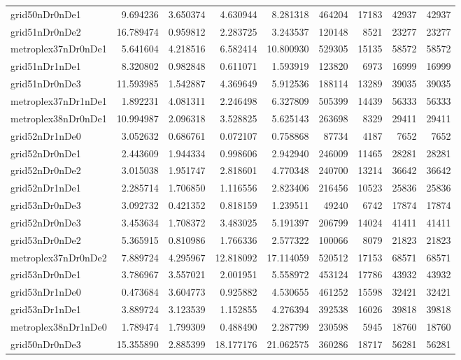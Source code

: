 \begin{longtable}{|l|r|r|r|r|r|r|r|r|}
grid50nDr0nDe1 & 9.694236 & 3.650374 & 4.630944 & 8.281318 & 464204 & 17183 & 42937 & 42937 \\
grid51nDr0nDe2 & 16.789474 & 0.959812 & 2.283725 & 3.243537 & 120148 & 8521 & 23277 & 23277 \\
metroplex37nDr0nDe1 & 5.641604 & 4.218516 & 6.582414 & 10.800930 & 529305 & 15135 & 58572 & 58572 \\
grid51nDr1nDe1 & 8.320802 & 0.982848 & 0.611071 & 1.593919 & 123820 & 6973 & 16999 & 16999 \\
grid51nDr0nDe3 & 11.593985 & 1.542887 & 4.369649 & 5.912536 & 188114 & 13289 & 39035 & 39035 \\
metroplex37nDr1nDe1 & 1.892231 & 4.081311 & 2.246498 & 6.327809 & 505399 & 14439 & 56333 & 56333 \\
metroplex38nDr0nDe1 & 10.994987 & 2.096318 & 3.528825 & 5.625143 & 263698 & 8329 & 29411 & 29411 \\
grid52nDr1nDe0 & 3.052632 & 0.686761 & 0.072107 & 0.758868 & 87734 & 4187 & 7652 & 7652 \\
grid52nDr0nDe1 & 2.443609 & 1.944334 & 0.998606 & 2.942940 & 246009 & 11465 & 28281 & 28281 \\
grid52nDr0nDe2 & 3.015038 & 1.951747 & 2.818601 & 4.770348 & 240700 & 13214 & 36642 & 36642 \\
grid52nDr1nDe1 & 2.285714 & 1.706850 & 1.116556 & 2.823406 & 216456 & 10523 & 25836 & 25836 \\
grid53nDr0nDe3 & 3.092732 & 0.421352 & 0.818159 & 1.239511 & 49240 & 6742 & 17874 & 17874 \\
grid52nDr0nDe3 & 3.453634 & 1.708372 & 3.483025 & 5.191397 & 206799 & 14024 & 41411 & 41411 \\
grid53nDr0nDe2 & 5.365915 & 0.810986 & 1.766336 & 2.577322 & 100066 & 8079 & 21823 & 21823 \\
metroplex37nDr0nDe2 & 7.889724 & 4.295967 & 12.818092 & 17.114059 & 520512 & 17153 & 68571 & 68571 \\
grid53nDr0nDe1 & 3.786967 & 3.557021 & 2.001951 & 5.558972 & 453124 & 17786 & 43932 & 43932 \\
grid53nDr1nDe0 & 0.473684 & 3.604773 & 0.925882 & 4.530655 & 461252 & 15598 & 32421 & 32421 \\
grid53nDr1nDe1 & 3.889724 & 3.123539 & 1.152855 & 4.276394 & 392538 & 16026 & 39818 & 39818 \\
metroplex38nDr1nDe0 & 1.789474 & 1.799309 & 0.488490 & 2.287799 & 230598 & 5945 & 18760 & 18760 \\
grid50nDr0nDe3 & 15.355890 & 2.885399 & 18.177176 & 21.062575 & 360286 & 18717 & 56281 & 56281 \\

\end{longtable}
